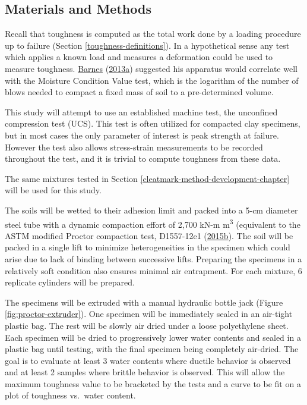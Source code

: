 \documentclass[
  letterpaper,
  openany]{book}
\begin{document}
\hypertarget{materials-and-methods-2}{%
\subsection{Materials and Methods}\label{materials-and-methods-2}}

Recall that toughness is computed as the total work done by a loading procedure up to failure (Section \ref{toughness-definitions}).
In a hypothetical sense any test which applies a known load and measures a deformation could be used to measure toughness.
\protect\hyperlink{ref-Barnes2013}{Barnes} (\protect\hyperlink{ref-Barnes2013}{2013a}) suggested his apparatus would correlate well with the Moisture Condition Value test, which is the logarithm of the number of blows needed to compact a fixed mass of soil to a pre-determined volume.

This study will attempt to use an established machine test, the unconfined compression test (UCS).
This test is often utilized for compacted clay specimens, but in most cases the only parameter of interest is peak strength at failure.
However the test also allows stress-strain measurements to be recorded throughout the test, and it is trivial to compute toughness from these data.

The same mixtures tested in Section \ref{cleatmark-method-development-chapter} will be used for this study.

The soils will be wetted to their adhesion limit and packed into a 5-cm diameter steel tube with a dynamic compaction effort of 2,700 kN-m m\textsuperscript{3} (equivalent to the ASTM modified Proctor compaction test, D1557-12e1 (\protect\hyperlink{ref-ASTMD15572015}{2015b}).
The soil will be packed in a single lift to minimize heterogeneities in the specimen which could arise due to lack of binding between successive lifts.
Preparing the specimens in a relatively soft condition also ensures minimal air entrapment.
For each mixture, 6 replicate cylinders will be prepared.

The specimens will be extruded with a manual hydraulic bottle jack (Figure \ref{fig:proctor-extruder}).
One specimen will be immediately sealed in an air-tight plastic bag.
The rest will be slowly air dried under a loose polyethylene sheet.
Each specimen will be dried to progressively lower water contents and sealed in a plastic bag until testing, with the final specimen being completely air-dried.
The goal is to evaluate at least 3 water contents where ductile behavior is observed and at least 2 samples where brittle behavior is observed.
This will allow the maximum toughness value to be bracketed by the tests and a curve to be fit on a plot of toughness vs.~water content.
\end{document}
